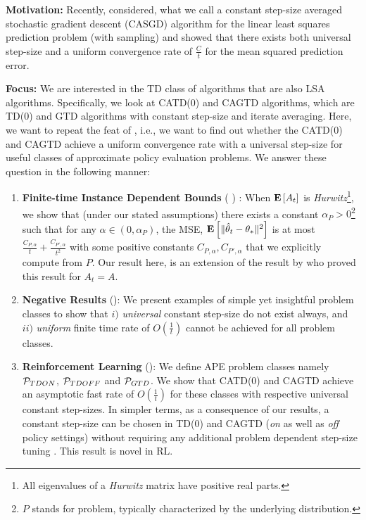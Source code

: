 \textbf{Motivation:} Recently, \citet{bach} considered, what we call a constant step-size averaged stochastic gradient descent (CASGD) 
 algorithm for the linear least squares prediction problem (with \iid sampling) and showed that there exists both universal step-size and a uniform convergence rate of $\frac{C}{t}$ for the mean squared prediction error.

\textbf{Focus:} We are interested in the TD class of algorithms that are also LSA algorithms. Specifically, we look at CATD(0) and CAGTD algorithms, which are TD(0) and GTD algorithms with constant step-size and iterate averaging. Here, we want to repeat the feat of \cite{bach}, i.e., we want to find out whether the CATD(0) and CAGTD achieve a uniform convergence rate with a universal step-size for useful classes of approximate policy evaluation problems. We answer these question in the following manner:
\begin{enumerate}[leftmargin=*]
\item \textbf{Finite-time Instance Dependent Bounds} ( ) : When $\EE{A_t}$ is \emph{Hurwitz}\footnote{All eigenvalues of a  \emph{Hurwitz} matrix have positive real parts.}, we show that (under our stated assumptions) there exists a constant $\alpha_P>0$\footnote{$P$ stands for problem, typically characterized by the underlying distribution.} such that for any $\alpha\in (0,\alpha_P)$,
the MSE, $\EE{\normsm{\thh_t-\ts}^2}$
is at most $\frac{C_{P,\alpha}}{t}+\frac{C_{P',\alpha}}{t^2}$ with some positive constants $C_{P,\alpha},C_{P',\alpha}$ that we explicitly compute from $P$.
Our result here, is an extension of the result by \citet{polyak-judisky} who proved this result for $A_t=A$.
\item \textbf{Negative Results} (): We present examples of simple yet insightful problem classes to show that $i)$ \emph{universal} constant step-size do not exist always, and $ii)$ \emph{uniform} finite time rate of $O(\frac{1}{t})$ cannot be achieved for all problem classes.
\item \textbf{Reinforcement Learning} (): We define APE problem classes namely $\P_{TDON}$, $\P_{TDOFF}$ and $\P_{GTD}$. We show that CATD(0) and CAGTD achieve an asymptotic fast rate of $O(\frac{1}{t})$ for these classes with respective universal constant step-sizes. In simpler terms, as a consequence of our results, a constant step-size can be chosen in TD(0) and CAGTD (\emph{on} as well as \emph{off} policy settings) without requiring any additional problem dependent step-size tuning . This result is novel in RL.
\end{enumerate}%
